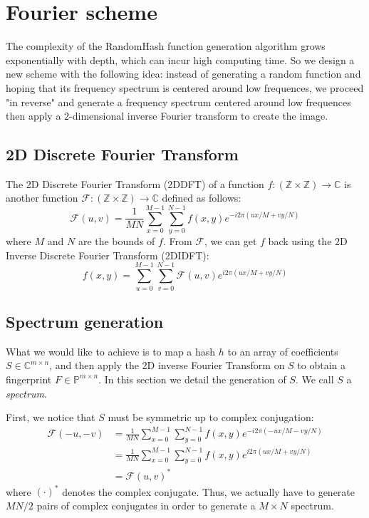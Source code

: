\documentclass{article}
\begin{document}
\section{Fourier scheme}
The complexity of the RandomHash function generation algorithm grows exponentially with depth, which can incur high computing time. So we design a new scheme with the following idea: instead of generating a random function and hoping that its frequency spectrum is centered around low frequences, we proceed "in reverse" and generate a frequency spectrum centered around low frequences then apply a 2-dimensional inverse Fourier transform to create the image.

\subsection{2D Discrete Fourier Transform}
The 2D Discrete Fourier Transform (2DDFT) of a function $f : (\mathbb{Z} \times \mathbb{Z}) \rightarrow \mathbb{C}$ is another function $\mathcal{F}: (\mathbb{Z} \times \mathbb{Z}) \rightarrow \mathbb{C}$ defined as follows:
$$\mathcal{F}(u,v) = \frac{1}{MN}\sum\limits_{x=0}^{M-1}\sum\limits_{y=0}^{N-1}f(x,y) e^{-i2\pi(ux/M + vy/N)}$$
where $M$ and $N$ are the bounds of $f$. From $\mathcal{F}$, we can get $f$ back using the 2D Inverse Discrete Fourier Transform (2DIDFT):
$$f(x,y) = \sum\limits_{u=0}^{M-1}\sum\limits_{v=0}^{N-1}\mathcal F(u,v) e^{i2\pi(ux/M + vy/N)}$$


\subsection{Spectrum generation}
What we would like to achieve is to map a hash $h$ to an array of coefficients $S \in \mathbb{C}^{m\times n}$, and then apply the 2D inverse Fourier Transform on $S$ to obtain a fingerprint $F \in \mathbb{P}^{m \times n}$. In this section we detail the generation of $S$. We call $S$ a \textit{spectrum}.

First, we notice that $S$ must be symmetric up to complex conjugation: 
\begin{align*}
    \mathcal{F}(-u,-v) &= \frac{1}{MN}\sum\limits_{x=0}^{M-1}\sum\limits_{y=0}^{N-1}f(x,y) e^{-i2\pi(-ux/M - vy/N)}\\
    &=  \frac{1}{MN}\sum\limits_{x=0}^{M-1}\sum\limits_{y=0}^{N-1}f(x,y) e^{i2\pi(ux/M + vy/N)}\\
    &= \mathcal{F}(u,v)^*
\end{align*}
where $(\cdot)^*$ denotes the complex conjugate. Thus, we actually have to generate $MN/2$ pairs of complex conjugates in order to generate a $M \times N$ spectrum.
\end{document}
